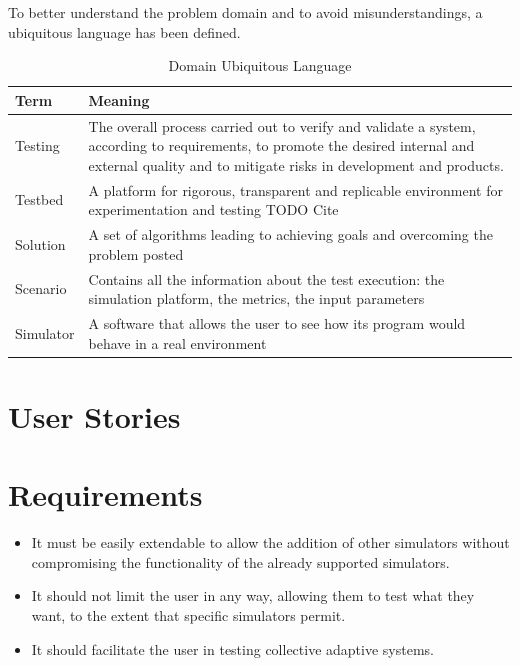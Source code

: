 \documentclass[12pt,a4paper,openright,twoside]{book}
\begin{document}
To better understand the problem domain and to avoid misunderstandings, a ubiquitous language has been defined.

\begin{table}[H]
    \centering
    \begin{tabular}{|l|p{}|}
    \toprule
    \textbf{Term} & \textbf{Meaning} \\
    \midrule                                                                                                                                                              
    Testing & The overall process carried out to verify and validate a system, according to requirements, to promote the desired internal and external quality and to mitigate risks in development and products. \\ \hline
    Testbed & A platform for rigorous, transparent and replicable environment for experimentation and testing TODO Cite \\ \hline
    Solution & A set of algorithms leading to achieving goals and overcoming the problem posted \\ \hline
    Scenario & Contains all the information about the test execution: the simulation platform, the metrics, the input parameters \\ \hline
    Simulator & A software that allows the user to see how its program would behave in a real environment \\ \hline
    \end{tabular}
    \caption{Domain Ubiquitous Language}
    \end{table}

\section{User Stories}

\section{Requirements}

\begin{itemize}
  \item It must be easily extendable to allow the addition of other simulators without compromising the functionality of the already supported simulators.
  \item It should not limit the user in any way, allowing them to test what they want, to the extent that specific simulators permit.
  \item It should facilitate the user in testing collective adaptive systems.
\end{itemize}
\end{document}

